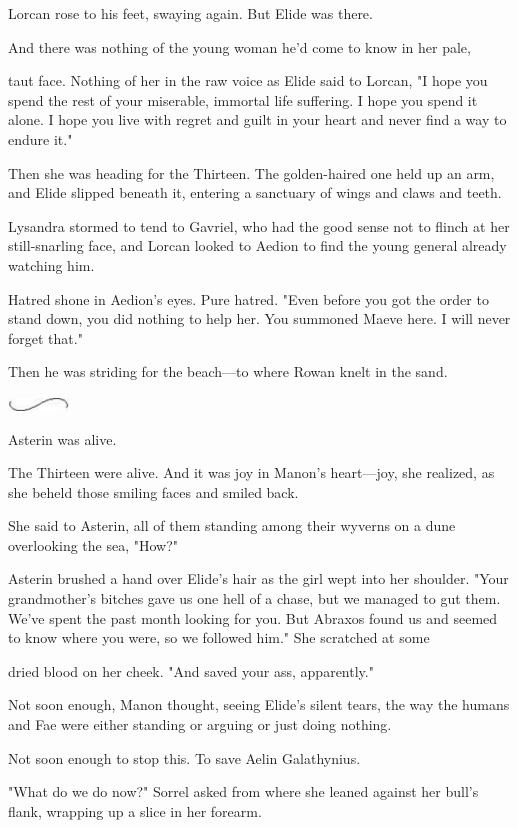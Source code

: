 Lorcan rose to his feet, swaying again. But Elide was there.

And there was nothing of the young woman he'd come to know in her pale,

taut face. Nothing of her in the raw voice as Elide said to Lorcan, "I hope you spend the rest of your miserable, immortal life suffering. I hope you spend it alone. I hope you live with regret and guilt in your heart and never find a way to endure it."

Then she was heading for the Thirteen. The golden-haired one held up an arm, and Elide slipped beneath it, entering a sanctuary of wings and claws and teeth.

Lysandra stormed to tend to Gavriel, who had the good sense not to flinch at her still-snarling face, and Lorcan looked to Aedion to find the young general already watching him.

Hatred shone in Aedion's eyes. Pure hatred. "Even before you got the order to stand down, you did nothing to help her. You summoned Maeve here. I will never forget that."

Then he was striding for the beach---to where Rowan knelt in the sand.

\includegraphics[width=0.65in,height=0.13in]{images/seperator}

Asterin was alive.

The Thirteen were alive. And it was joy in Manon's heart---joy, she realized, as she beheld those smiling faces and smiled back.

She said to Asterin, all of them standing among their wyverns on a dune overlooking the sea, "How?"

Asterin brushed a hand over Elide's hair as the girl wept into her shoulder. "Your grandmother's bitches gave us one hell of a chase, but we managed to gut them. We've spent the past month looking for you. But Abraxos found us and seemed to know where you were, so we followed him." She scratched at some

dried blood on her cheek. "And saved your ass, apparently."

Not soon enough, Manon thought, seeing Elide's silent tears, the way the humans and Fae were either standing or arguing or just doing nothing.

Not soon enough to stop this. To save Aelin Galathynius.

"What do we do now?" Sorrel asked from where she leaned against her bull's flank, wrapping up a slice in her forearm.

